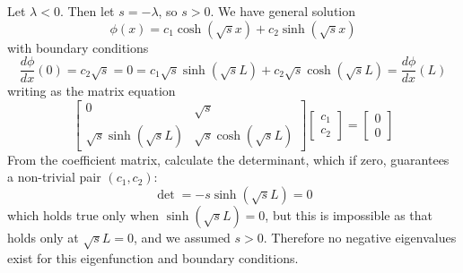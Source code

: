 \documentclass[a4paper]{article}
\begin{document}
\vspace{12pt}


Let \( \lambda < 0 \). Then let \( s = -\lambda \), so \( s > 0 \). We have general solution
\[
	\phi \!\left( x \right) = c_{1}\cosh\!\left(\sqrt{s}x\right) + c_{2}\sinh\!\left(\sqrt{s}x\right) 
\]
with boundary conditions
\[
	\frac{d \phi}{d x}\!\left( 0 \right) = c_{2}\sqrt{s} = 0 = c_{1}\sqrt{s}\sinh\!\left(\sqrt{s}L\right) + c_{2}\sqrt{s}\cosh\!\left(\sqrt{s}L\right) = \frac{d \phi}{d x}\!\left( L \right)
\]
writing as the matrix equation
\[
	\begin{bmatrix}
		0 & \sqrt{s} \\
		\sqrt{s}\sinh\!\left(\sqrt{s}L\right) & \sqrt{s}\cosh\!\left(\sqrt{s}L\right)
	\end{bmatrix}
	\begin{bmatrix}
		c_{1}\\
		c_{2}
	\end{bmatrix}
	=
	\begin{bmatrix}
		0\\
		0
	\end{bmatrix}
\]
From the coefficient matrix, calculate the determinant, which if zero, guarantees a non-trivial pair \( \left( c_{1}, c_{2} \right) \):
\[
	\det = -s\sinh\!\left(\sqrt{s}L\right) = 0 
\]
which holds true only when \( \sinh\!\left(\sqrt{s}L\right) = 0 \), but this is impossible as that holds only at \( \sqrt{s}L = 0 \), and we assumed \( s > 0 \). Therefore no negative eigenvalues exist for this eigenfunction and boundary conditions.

\vspace{12pt}

\end{document}

